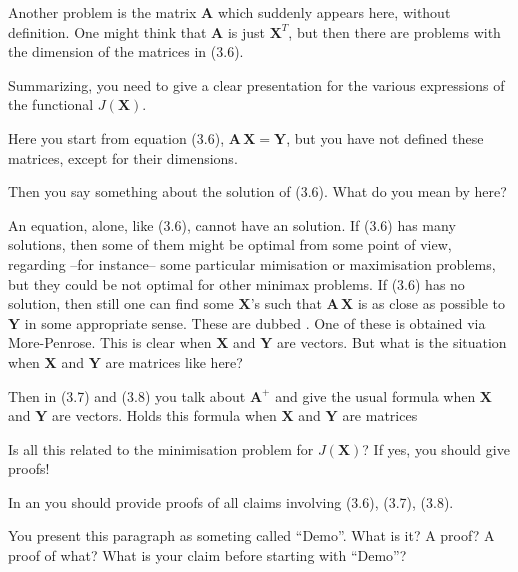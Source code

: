 \begin{description}[style=unboxed,leftmargin=0cm,itemsep=3ex]
Another problem is the matrix $\mathbf{A}$ which suddenly appears here,
without definition.
One might think that $\mathbf{A}$ is just $\mathbf{X}^T$,
but then there are problems with the dimension of the matrices in (3.6).

Summarizing, you need to give a clear presentation for the various
expressions of the functional $J(\mathbf{X})$.

Here you start from equation (3.6), $\mathbf{A}\,\mathbf{X}=\mathbf{Y}$,
but you have not defined these matrices, except for their dimensions.

Then you say something about the  solution of (3.6).
What do you mean by  here?

An equation, alone, like (3.6), cannot have an  solution.
If (3.6) has many solutions, then some of them might be optimal from
some point of view, regarding --for instance-- some particular mimisation
or maximisation problems, but they could be not optimal for other
minimax problems.
If (3.6) has no solution, then still one can find some $\mathbf{X}$'s
such that $\mathbf{A}\,\mathbf{X}$ is as close as possible to $\mathbf{Y}$
in some appropriate sense.
These are dubbed .
One of these  is obtained via More-Penrose.
This is clear when $\mathbf{X}$ and $\mathbf{Y}$ are vectors.
But what is the situation when $\mathbf{X}$ and $\mathbf{Y}$ are matrices
like here?

Then in (3.7) and (3.8) you talk about $\mathbf{A}^+$ and give the usual
formula when $\mathbf{X}$ and $\mathbf{Y}$ are vectors.
Holds this formula when $\mathbf{X}$ and $\mathbf{Y}$ are matrices

Is all this related to the minimisation problem for $J(\mathbf{X})$?
If yes, you should give proofs!

In an  you should provide proofs of all claims involving
(3.6), (3.7), (3.8).


You present this paragraph as someting called ``Demo''.
What is it? A proof? A proof of what? 
What is your claim before starting with ``Demo''?



\end{description}
